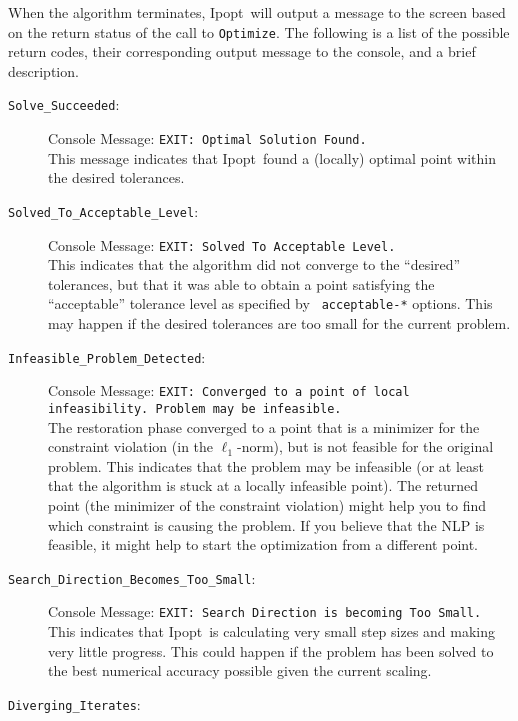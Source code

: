 \documentclass[10pt]{article}
\newcommand{\Ipopt}{{\sc Ipopt}}
\begin{document}
When the algorithm terminates, \Ipopt\ will output a message to the
screen based on the return status of the call to {\tt Optimize}. The following
is a list of the possible return codes, their corresponding output message
to the console, and a brief description.
\begin{description}
\item[{\tt Solve\_Succeeded}:] $\;$ \\
  Console Message: {\tt EXIT: Optimal Solution Found.} \\
  This message indicates that \Ipopt\ found a (locally) optimal point
  within the desired tolerances.
\item[{\tt Solved\_To\_Acceptable\_Level}:]  $\;$ \\
  Console Message: {\tt EXIT: Solved To Acceptable Level.} \\
  This indicates that the algorithm did not converge to the
  ``desired'' tolerances, but that it was able to obtain a point
  satisfying the ``acceptable'' tolerance level as specified by {\tt
    acceptable-*} options. This may happen if the desired tolerances
  are too small for the current problem.
\item[{\tt Infeasible\_Problem\_Detected}:]  $\;$ \\
  Console Message: {\tt EXIT: Converged to a point of
    local infeasibility. Problem may be infeasible.} \\
  The restoration phase converged to a point that is a minimizer for
  the constraint violation (in the $\ell_1$-norm), but is not feasible
  for the original problem. This indicates that the problem may be
  infeasible (or at least that the algorithm is stuck at a locally
  infeasible point).  The returned point (the minimizer of the
  constraint violation) might help you to find which constraint is
  causing the problem.  If you believe that the NLP is feasible,
  it might help to start the optimization from a different point.
\item[{\tt Search\_Direction\_Becomes\_Too\_Small}:]  $\;$ \\
  Console Message: {\tt EXIT: Search Direction is becoming Too Small.} \\
  This indicates that \Ipopt\ is calculating very small step sizes and
  making very little progress.  This could happen if the problem has
  been solved to the best numerical accuracy possible given the
  current scaling.
\item[{\tt Diverging\_Iterates}:]  $\;$ \\

\end{description}
\end{document}
